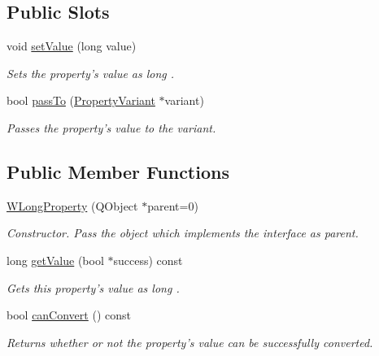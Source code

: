 \subsection*{Public Slots}
\begin{DoxyCompactItemize}
\item 
void \hyperlink{class_w_long_property_a872aed166209715a26dd676b8b4e7fb4}{set\-Value} (long value)
\begin{DoxyCompactList}\small\item\em Sets the property's value as long . \end{DoxyCompactList}\item 
bool \hyperlink{class_w_long_property_aae809092632e6b8c82cade134d20f89e}{pass\-To} (\hyperlink{class_property_variant}{Property\-Variant} $\ast$variant)
\begin{DoxyCompactList}\small\item\em Passes the property's value to the variant. \end{DoxyCompactList}\end{DoxyCompactItemize}
\subsection*{Public Member Functions}
\begin{DoxyCompactItemize}
\item 
\hyperlink{class_w_long_property_af8f2e6601d3bfd7a70a9f061bdb19fb3}{W\-Long\-Property} (Q\-Object $\ast$parent=0)
\begin{DoxyCompactList}\small\item\em Constructor. Pass the object which implements the interface as parent. \end{DoxyCompactList}\item 
long \hyperlink{class_w_long_property_a2832bb647a51aa6688d4323e44254314}{get\-Value} (bool $\ast$success) const 
\begin{DoxyCompactList}\small\item\em Gets this property's value as long . \end{DoxyCompactList}\item 
bool \hyperlink{class_w_long_property_af0761e534c58bf6b41776dc1298daf8a}{can\-Convert} () const 
\begin{DoxyCompactList}\small\item\em Returns whether or not the property's value can be successfully converted. \end{DoxyCompactList}\end{DoxyCompactItemize}

